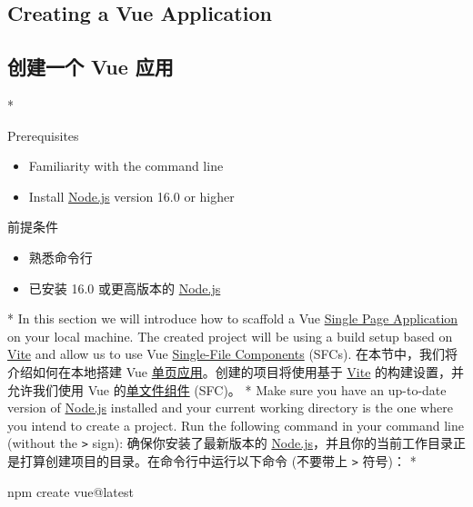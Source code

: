 \begin{paracol}{2}
\subsection{Creating a Vue Application}
\switchcolumn
\subsection{创建一个 Vue 应用}
\switchcolumn[0]*%
\begin{vueQuote}{Prerequisites}
\begin{itemize}
\item
    Familiarity with the command line
\item
    Install \href{https://nodejs.org/}{Node.js} version 16.0 or higher
\end{itemize}        
\end{vueQuote}    
\switchcolumn
\begin{vueQuote}{前提条件}
\begin{itemize}
\item
    熟悉命令行
\item
    已安装 16.0 或更高版本的 \href{https://nodejs.org/}{Node.js}
\end{itemize}
\end{vueQuote}    
\switchcolumn[0]*%
In this section we will introduce how to scaffold a Vue
\href{https://vuejs.org/guide/extras/ways-of-using-vue.html\#single-page-application-spa}{Single
Page Application} on your local machine. The created project will be
using a build setup based on \href{https://vitejs.dev/}{Vite} and allow
us to use Vue
\href{https://vuejs.org/guide/scaling-up/sfc.html}{Single-File
Components} (SFCs).
\switchcolumn
在本节中，我们将介绍如何在本地搭建 Vue
\href{https://cn.vuejs.org/guide/extras/ways-of-using-vue.html\#single-page-application-spa}{单页应用}。创建的项目将使用基于
\href{https://vitejs.dev/}{Vite} 的构建设置，并允许我们使用 Vue
的\href{https://cn.vuejs.org/guide/scaling-up/sfc.html}{单文件组件}
(SFC)。
\switchcolumn[0]*%
Make sure you have an up-to-date version of
\href{https://nodejs.org/}{Node.js} installed and your current working
directory is the one where you intend to create a project. Run the
following command in your command line (without the
\texttt{\textgreater{}} sign): 
\switchcolumn
确保你安装了最新版本的
\href{https://nodejs.org/}{Node.js}，并且你的当前工作目录正是打算创建项目的目录。在命令行中运行以下命令
(不要带上 \texttt{\textgreater{}} 符号)：
\switchcolumn[0]*%
\begin{codeShell}
npm create vue@latest

\end{codeShell}
\end{paracol}
